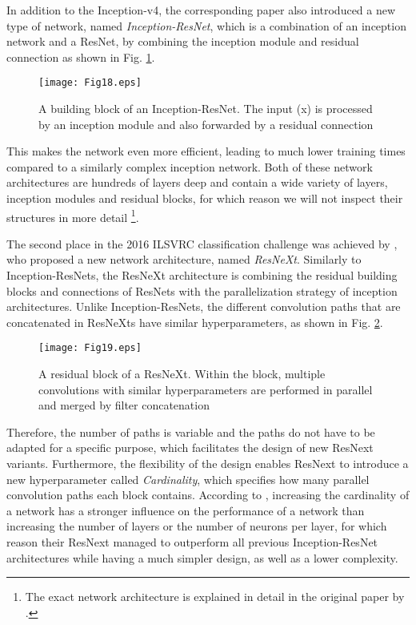 \documentclass[conference]{IEEEtran}
\begin{document}
In addition to the Inception-v4, the corresponding paper also introduced a new type of network, named \emph{Inception-ResNet}, which is a combination of an inception network and a ResNet, by combining the inception module and residual connection as shown in Fig. \ref{fig:inceptionresnet}.

\begin{figure}
\texttt{[image: Fig18.eps]}
\caption{A building block of an Inception-ResNet. The input (x) is processed by an inception module and also forwarded by a residual connection}
\label{fig:inceptionresnet}
\end{figure}

This makes the network even more efficient, leading to much lower training times compared to a similarly complex inception network. Both of these network architectures are hundreds of layers deep and contain a wide variety of layers, inception modules and residual blocks, for which reason we will not inspect their structures in more detail \footnote{The exact network architecture is explained in detail in the original paper by \cite{Inception}.}.

The second place in the 2016 ILSVRC classification challenge was achieved by \cite{ResNext}, who proposed a new network architecture, named \emph{ResNeXt}. Similarly to Inception-ResNets, the ResNeXt architecture is combining the residual building blocks and connections of ResNets with the parallelization strategy of inception architectures. Unlike Inception-ResNets, the different convolution paths that are concatenated in ResNeXts have similar hyperparameters, as shown in Fig. \ref{fig:resnext}.

\begin{figure}
\texttt{[image: Fig19.eps]}
\caption{A residual block of a ResNeXt. Within the block, multiple convolutions with similar hyperparameters are performed in parallel and merged by filter concatenation}
\label{fig:resnext}
\end{figure}

Therefore, the number of paths is variable and the paths do not have to be adapted for a specific purpose, which facilitates the design of new ResNext variants. Furthermore, the flexibility of the design enables ResNext to introduce a new hyperparameter called \emph{Cardinality}, which specifies how many parallel convolution paths each block contains. According to \cite{ResNext}, increasing the cardinality of a network has a stronger influence on the performance of a network than increasing the number of layers or the number of neurons per layer, for which reason their ResNext managed to outperform all previous Inception-ResNet architectures while having a much simpler design, as well as a lower complexity.
\end{document}
